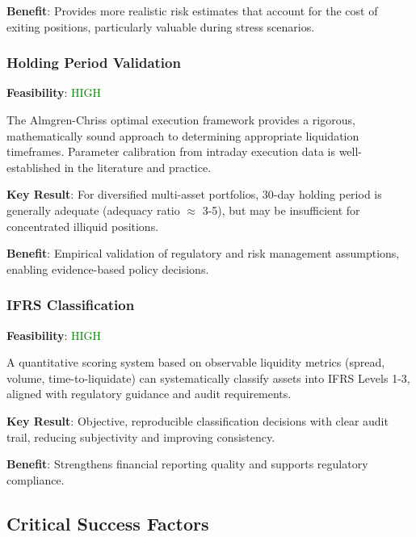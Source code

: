 \documentclass[11pt,a4paper]{article}
\begin{document}
\textbf{Benefit}: Provides more realistic risk estimates that account for the cost of exiting positions, particularly valuable during stress scenarios.

\subsubsection{Holding Period Validation}

\textbf{Feasibility}: \textcolor{green}{HIGH}

The Almgren-Chriss optimal execution framework provides a rigorous, mathematically sound approach to determining appropriate liquidation timeframes. Parameter calibration from intraday execution data is well-established in the literature and practice.

\textbf{Key Result}: For diversified multi-asset portfolios, 30-day holding period is generally adequate (adequacy ratio $\approx$ 3-5), but may be insufficient for concentrated illiquid positions.

\textbf{Benefit}: Empirical validation of regulatory and risk management assumptions, enabling evidence-based policy decisions.

\subsubsection{IFRS Classification}

\textbf{Feasibility}: \textcolor{green}{HIGH}

A quantitative scoring system based on observable liquidity metrics (spread, volume, time-to-liquidate) can systematically classify assets into IFRS Levels 1-3, aligned with regulatory guidance and audit requirements.

\textbf{Key Result}: Objective, reproducible classification decisions with clear audit trail, reducing subjectivity and improving consistency.

\textbf{Benefit}: Strengthens financial reporting quality and supports regulatory compliance.

\subsection{Critical Success Factors}
\end{document}
